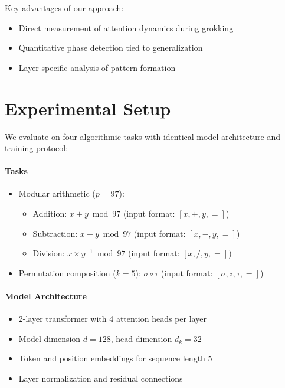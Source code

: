 \documentclass{article} %
\begin{document}
Key advantages of our approach:
\begin{itemize}
    \item Direct measurement of attention dynamics during grokking
    \item Quantitative phase detection tied to generalization
    \item Layer-specific analysis of pattern formation
\end{itemize}

\section{Experimental Setup}
\label{sec:experimental}

We evaluate on four algorithmic tasks with identical model architecture and training protocol:

\paragraph{Tasks} 
\begin{itemize}
    \item Modular arithmetic ($p=97$):
    \begin{itemize}
        \item Addition: $x + y \bmod 97$ (input format: $[x, +, y, =]$)
        \item Subtraction: $x - y \bmod 97$ (input format: $[x, -, y, =]$)
        \item Division: $x \times y^{-1} \bmod 97$ (input format: $[x, /, y, =]$)
    \end{itemize}
    \item Permutation composition ($k=5$): $\sigma \circ \tau$ (input format: $[\sigma, \circ, \tau, =]$)
\end{itemize}

\paragraph{Model Architecture}
\begin{itemize}
    \item 2-layer transformer with 4 attention heads per layer
    \item Model dimension $d=128$, head dimension $d_k=32$
    \item Token and position embeddings for sequence length 5
    \item Layer normalization \citep{ba2016layer} and residual connections
\end{itemize}
\end{document}
